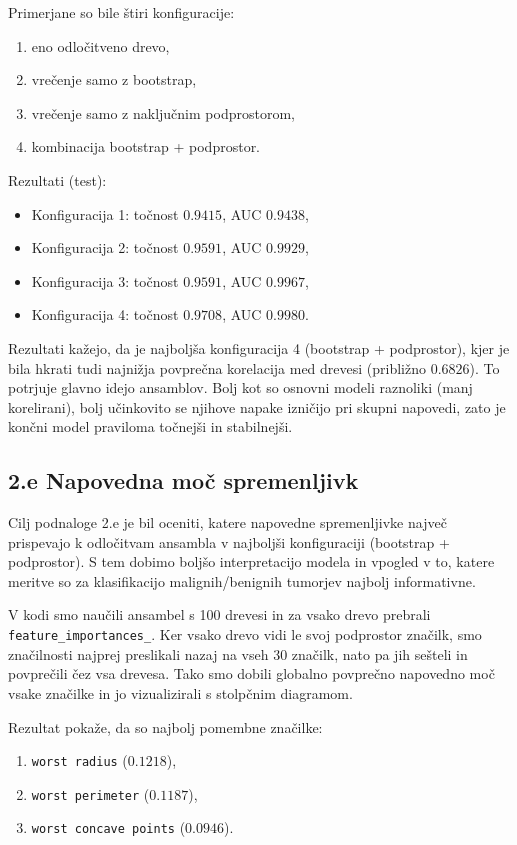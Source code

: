 \documentclass[12pt,a4paper]{article}
\begin{document}
Primerjane so bile štiri konfiguracije:
\begin{enumerate}
    \item eno odločitveno drevo,
    \item vrečenje samo z bootstrap,
    \item vrečenje samo z naključnim podprostorom,
    \item kombinacija bootstrap + podprostor.
\end{enumerate}

Rezultati (test):
\begin{itemize}
    \item Konfiguracija 1: točnost $0.9415$, AUC $0.9438$,
    \item Konfiguracija 2: točnost $0.9591$, AUC $0.9929$,
    \item Konfiguracija 3: točnost $0.9591$, AUC $0.9967$,
    \item Konfiguracija 4: točnost $0.9708$, AUC $0.9980$.
\end{itemize}

Rezultati kažejo, da je najboljša konfiguracija 4 (bootstrap + podprostor), kjer je bila hkrati tudi najnižja povprečna korelacija med drevesi (približno $0.6826$). To potrjuje glavno idejo ansamblov. Bolj kot so osnovni modeli raznoliki (manj korelirani), bolj učinkovito se njihove napake izničijo pri skupni napovedi, zato je končni model praviloma točnejši in stabilnejši.

\subsection*{2.e Napovedna moč spremenljivk}
Cilj podnaloge 2.e je bil oceniti, katere napovedne spremenljivke največ prispevajo k odločitvam ansambla v najboljši konfiguraciji (bootstrap + podprostor). S tem dobimo boljšo interpretacijo modela in vpogled v to, katere meritve so za klasifikacijo malignih/benignih tumorjev najbolj informativne.

V kodi smo naučili ansambel s 100 drevesi in za vsako drevo prebrali \texttt{feature\_importances\_}. Ker vsako drevo vidi le svoj podprostor značilk, smo značilnosti najprej preslikali nazaj na vseh 30 značilk, nato pa jih sešteli in povprečili čez vsa drevesa. Tako smo dobili globalno povprečno napovedno moč vsake značilke in jo vizualizirali s stolpčnim diagramom.

\newpage
Rezultat pokaže, da so najbolj pomembne značilke:

\begin{enumerate}
    \item \texttt{worst radius} ($0.1218$),
    \item \texttt{worst perimeter} ($0.1187$),
    \item \texttt{worst concave points} ($0.0946$).
\end{enumerate}
\end{document}
